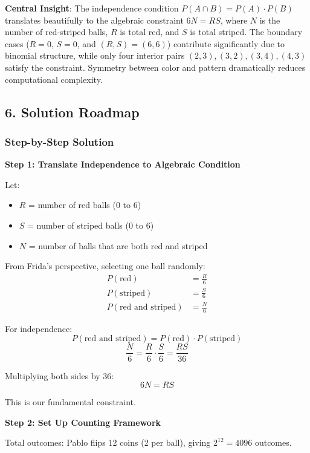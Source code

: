\documentclass[12pt]{article}
\begin{document}
\begin{keyinsight}
\textbf{Central Insight}: The independence condition $P(A \cap B) = P(A) \cdot P(B)$ translates beautifully to the algebraic constraint $6N = RS$, where $N$ is the number of red-striped balls, $R$ is total red, and $S$ is total striped. The boundary cases ($R = 0$, $S = 0$, and $(R,S) = (6,6)$) contribute significantly due to binomial structure, while only four interior pairs $(2,3), (3,2), (3,4), (4,3)$ satisfy the constraint. Symmetry between color and pattern dramatically reduces computational complexity.
\end{keyinsight}

\begin{solutionbox}
\subsection*{6. Solution Roadmap}

\subsubsection*{Step-by-Step Solution}

\textbf{Step 1: Translate Independence to Algebraic Condition}

Let:
\begin{itemize}
    \item $R$ = number of red balls (0 to 6)
    \item $S$ = number of striped balls (0 to 6)
    \item $N$ = number of balls that are both red and striped
\end{itemize}

From Frida's perspective, selecting one ball randomly:
\begin{align*}
P(\text{red}) &= \frac{R}{6} \\
P(\text{striped}) &= \frac{S}{6} \\
P(\text{red and striped}) &= \frac{N}{6}
\end{align*}

For independence:
$$P(\text{red and striped}) = P(\text{red}) \cdot P(\text{striped})$$
$$\frac{N}{6} = \frac{R}{6} \cdot \frac{S}{6} = \frac{RS}{36}$$

Multiplying both sides by 36:
$$\boxed{6N = RS}$$

This is our fundamental constraint.

\textbf{Step 2: Set Up Counting Framework}

Total outcomes: Pablo flips 12 coins (2 per ball), giving $2^{12} = 4096$ outcomes.


\end{solutionbox}
\end{document}
